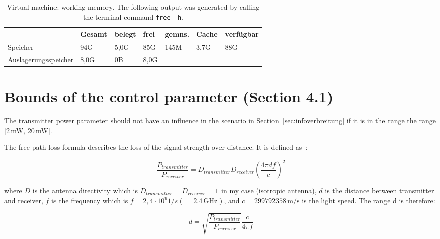 \begin{table}[hbt!]
\begin{footnotesize}
\begin{tabular}{|p{3cm}|p{1.5cm}|p{1.5cm}|p{1.5cm}|p{1.5cm}|p{1.5cm}|p{1.5cm}|}
\hline
             &  Gesamt    &  belegt  &  frei    &    gemns. & Cache  & verfügbar  \\ \hline
Speicher & 94G & 5,0G & 85G & 145M & 3,7G & 88G \\ \hline
Auslagerungsspeicher&    8,0G    &  0B   &  8,0G  & & &\\ \hline
\end{tabular}
\end{footnotesize}
\caption{Virtual machine: working memory. The following output was generated by calling the terminal command \lstinline{free -h}\textit{}.}
\label{tab:memory}
\end{table}



\newpage

\chapter{Bounds of the control parameter (Section 4.1)}
\label{sec:networkparameters}

The transmitter power parameter should not have an influence in the scenario in Section~\ref{sec:infoverbreitung} if it is in the range the range [2\,mW, 20\,mW]. 


The free path loss formula describes the loss of the signal strength over distance. It is defined as~\cite{friis-1946-com}:

\begin{equation}
\frac{P_{transmitter}}{P_{receiver}} = D_{transmitter} D_{receiver} \left( \frac{4\pi d f}{c} \right)^2
\end{equation}

where $D$ is the antenna directivity which is $D_{transmitter}=D_{receiver}=1$ in my case (isotropic antenna), $d$ is the distance between transmitter and receiver, $f$ is the frequency which is $f=2,4 \cdot 10^9 1/s (= 2.4\,\text{GHz})$, and $c=299 792 358\,\text{m/s}$ is the light speed. The range d is therefore:


\begin{equation}
d = \sqrt{ \frac{P_{transmitter}}{P_{receiver}} }  \frac{c}  {4\pi f}
\label{eq:friis}
\end{equation}

